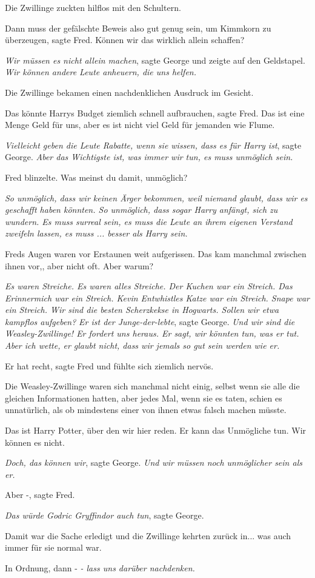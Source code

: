 Die Zwillinge zuckten hilflos mit den Schultern.

\glqq Dann muss der gefälschte Beweis also gut genug sein, um Kimmkorn zu
überzeugen\grqq{}, sagte Fred. \glqq Können wir das wirklich allein
schaffen?\grqq{}

\glqq \emph{Wir müssen es nicht allein machen}\grqq{}, sagte George und zeigte
auf den Geldstapel. \glqq \emph{Wir können andere Leute anheuern, die uns
helfen.}\grqq{}

Die Zwillinge bekamen einen nachdenklichen Ausdruck im Gesicht.

\glqq Das könnte Harrys Budget ziemlich schnell aufbrauchen\grqq{}, sagte Fred.
\glqq Das ist eine Menge Geld für uns, aber es ist nicht viel Geld für jemanden
wie Flume.\grqq{}

\glqq \emph{Vielleicht geben die Leute Rabatte, wenn sie wissen, dass es für
Harry ist}\grqq{}, sagte George. \glqq \emph{Aber das Wichtigste ist, was immer
wir tun, es muss unmöglich sein.}\grqq{}

Fred blinzelte. \glqq Was meinst du damit, unmöglich?\grqq{}

\glqq \emph{So unmöglich, dass wir keinen Ärger bekommen, weil niemand glaubt,
dass wir es geschafft haben könnten. So unmöglich, dass sogar Harry anfängt,
sich zu wundern. Es muss surreal sein, es muss die Leute an ihrem eigenen
Verstand zweifeln lassen, es muss ... besser als Harry sein.}\grqq{}

Freds Augen waren vor Erstaunen weit aufgerissen. Das kam manchmal zwischen
ihnen vor,, aber nicht oft. \glqq Aber warum?\grqq{}

\glqq \emph{Es waren Streiche. Es waren alles Streiche. Der Kuchen war ein
Streich. Das Erinnermich war ein Streich. Kevin Entwhistles Katze war ein
Streich. Snape war ein Streich. Wir sind die besten Scherzkekse in Hogwarts.
Sollen wir etwa kampflos aufgeben?}\grqq{} \glqq \emph{Er ist der
Junge-der-lebte}\grqq{}, sagte George. \glqq \emph{Und wir sind die
Weasley-Zwillinge! Er fordert uns heraus. Er sagt, wir könnten tun, was er tut.
Aber ich wette, er glaubt nicht, dass wir jemals so gut sein werden wie
er.}\grqq{}

\glqq Er hat recht\grqq{}, sagte Fred und fühlte sich ziemlich nervös.

Die Weasley-Zwillinge waren sich manchmal nicht einig, selbst wenn sie alle die
gleichen Informationen hatten, aber jedes Mal, wenn sie es taten, schien es
unnatürlich, als ob mindestens einer von ihnen etwas falsch machen müsste.

\glqq Das ist Harry Potter, über den wir hier reden. Er kann das Unmögliche tun.
Wir können es nicht.\grqq{}

\glqq \emph{Doch, das können wir}\grqq{}, sagte George. \glqq \emph{Und wir
müssen noch unmöglicher sein als er.}\grqq{}

\glqq Aber -\grqq{}, sagte Fred.

\glqq \emph{Das würde Godric Gryffindor auch tun}\grqq{}, sagte George.

Damit war die Sache erledigt und die Zwillinge kehrten zurück in... was auch
immer für sie normal war.

\glqq In Ordnung, dann -\grqq{} \glqq \emph{- lass uns darüber
nachdenken.}\grqq{}

